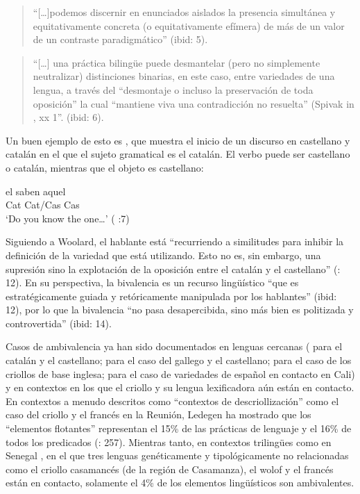 \documentclass[output=paper]{langscibook}
\begin{document}
\begin{quote}
“[…]podemos discernir en enunciados aislados la presencia simultánea y equitativamente concreta (o equitativamente efímera) de más de un valor de un contraste paradigmático” (ibid: 5).
\end{quote}

\begin{quote}
“[…] una práctica bilingüe puede desmantelar (pero no simplemente neutralizar) distinciones binarias, en este caso, entre variedades de una lengua, a través del “desmontaje o incluso la preservación de toda oposición” la cual “mantiene viva una contradicción no resuelta” (Spivak in \citealt{Derrida1974}, xx 1”.  (ibid: 6).
\end{quote}

   Un buen ejemplo de esto es , que muestra el inicio de un discurso en castellano y catalán en el que el sujeto gramatical es el catalán. El verbo puede ser castellano o catalán, mientras que el objeto es castellano:

\ea\label{ex:leglise:2}
 \gll  el          saben     aquel  \\
     Cat  Cat/Cas   Cas \\
  \glt `Do you know the one…' (\citealt{Woolard1998} :7)
\z

Siguiendo a Woolard, el hablante está “recurriendo a similitudes para inhibir la definición de la variedad que está utilizando. Esto no es, sin embargo, una supresión sino la explotación de la oposición entre el catalán y el castellano” (\citeyear{Woolard1998}: 12). En su perspectiva, la bivalencia es un recurso lingüístico “que es estratégicamente guiada y retóricamente manipulada por los hablantes” (ibid: 12), por lo que la bivalencia “no pasa desapercibida, sino más bien es politizada y controvertida” (ibid: 14).

Casos de ambivalencia ya han sido documentados en lenguas cercanas (\citet{Woolard1998} para el catalán y el castellano; \citet{ÁlvarezCáccamo1990} para el caso del gallego y el castellano; \citet{MiggeLéglise2013} para el caso de los criollos de base inglesa;  \citet{SánchezMoreano2015} para el caso de variedades de español en contacto en Cali) y en contextos en los que el criollo y su lengua lexificadora aún están en contacto. En contextos a menudo descritos como “contextos de descriollización” como el caso del criollo y el francés en la Reunión, Ledegen ha mostrado que los “elementos flotantes” representan el 15\% de las prácticas de lenguaje y el 16\% de todos los predicados (\citeyear{Ledegen2012}: 257). Mientras tanto, en contextos trilingües como en Senegal \citep{Nunez2015}, en el que tres lenguas genéticamente y tipológicamente no relacionadas como el criollo casamancés (de la región de Casamanza), el wolof y el francés están en contacto, solamente el 4\% de los elementos lingüísticos son ambivalentes.
\end{document}
